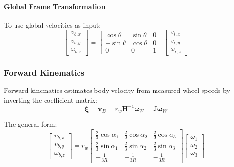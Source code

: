 \paragraph{Global Frame Transformation}
To use global velocities as input:
\begin{equation}
\begin{bmatrix} v_{b,x} \\ v_{b,y} \\ \omega_{b,z} \end{bmatrix} = \begin{bmatrix} \cos\theta & \sin\theta & 0 \\ -\sin\theta & \cos\theta & 0 \\ 0 & 0 & 1 \end{bmatrix} \begin{bmatrix} v_{i,x} \\ v_{i,y} \\ \omega_{i,z} \end{bmatrix}
\label{eq:frame_transform}
\end{equation}

\subsubsection{Forward Kinematics}

Forward kinematics estimates body velocity from measured wheel speeds by inverting the coefficient matrix:
\begin{equation}
\boldsymbol{\xi} = \mathbf{v}_B = r_w \mathbf{H}^{-1} \boldsymbol{\omega}_W = \mathbf{J} \boldsymbol{\omega}_W
\label{eq:fk_compact}
\end{equation}

The general form:
\begin{equation}
\begin{bmatrix} v_{b,x} \\ v_{b,y} \\ \omega_{b,z} \end{bmatrix} = r_w \begin{bmatrix} \frac{2}{3}\cos\alpha_1 & \frac{2}{3}\cos\alpha_2 & \frac{2}{3}\cos\alpha_3 \\ \frac{2}{3}\sin\alpha_1 & \frac{2}{3}\sin\alpha_2 & \frac{2}{3}\sin\alpha_3 \\ -\frac{1}{3R} & -\frac{1}{3R} & -\frac{1}{3R} \end{bmatrix} \begin{bmatrix} \omega_1 \\ \omega_2 \\ \omega_3 \end{bmatrix}
\label{eq:fk_general}
\end{equation}


